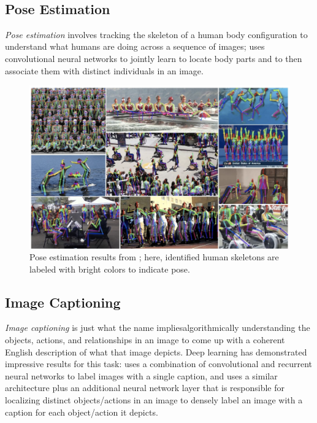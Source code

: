 \documentclass{article}
\begin{document}
\

\subsection{Pose Estimation}

\textit{Pose estimation} involves tracking the skeleton of a human body configuration to understand what humans are doing across a sequence of images; \cite{poseest} uses convolutional neural networks to jointly learn to locate body parts and to then associate them with distinct individuals in an image.

\begin{figure}[h]
\includegraphics[width=12cm]{poseest.png}
\centering
\caption{Pose estimation results from \cite{poseest}; here, identified human skeletons are labeled with bright colors to indicate pose.}
\end{figure}

\subsection{Image Captioning}

\textit{Image captioning} is just what the name implies\textemdash algorithmically understanding the objects, actions, and relationships in an image to come up with a coherent English description of what that image depicts. Deep learning has demonstrated impressive results for this task: \cite{singlecap} uses a combination of convolutional and recurrent neural networks to label images with a single caption, and \cite{densecap} uses a similar architecture plus an additional neural network layer that is responsible for localizing distinct objects/actions in an image to densely label an image with a caption for each object/action it depicts.
\end{document}
